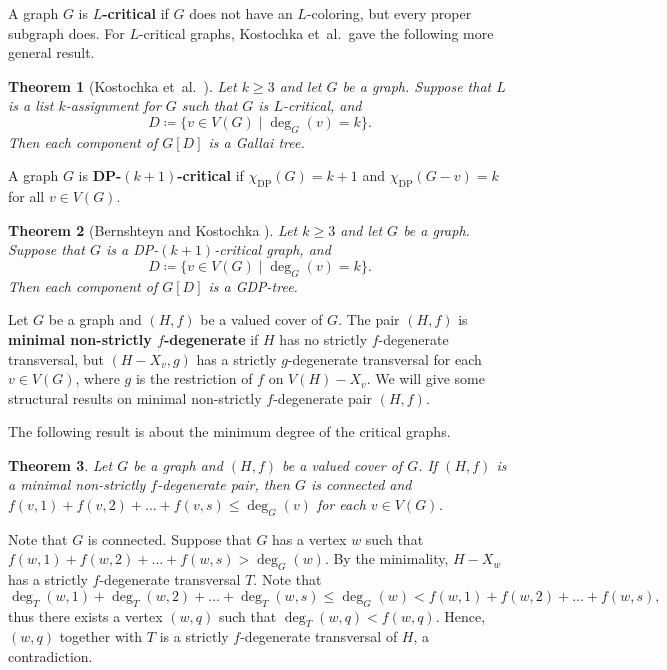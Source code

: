 \documentclass{article}
\makeatletter
\renewenvironment{proof}[1][\proofname]{\par
  \pushQED{\qed}%
  \normalfont \topsep6\p@\@plus6\p@\relax
  \trivlist
  \item[\hskip\labelsep
        \bfseries
    #1\@addpunct{.}]\ignorespaces
}{%
  \popQED\endtrivlist\@endpefalse
}
\newtheorem{theorem}{Theorem}[section]
\theoremstyle{definition}
\newcommand{\etal}{et~al.\ }
\makeatother
\begin{document}
A graph $G$ is \textbf{$L$-critical} if $G$ does not have an $L$-coloring, but every proper subgraph does. For $L$-critical graphs, Kostochka \etal gave the following more general result. 

\begin{theorem}[Kostochka \etal \cite{MR1425799}]\label{Critical-2}
Let $k \geq 3$ and let $G$ be a graph. Suppose that $L$ is a list $k$-assignment for $G$ such that $G$ is $L$-critical, and 
\begin{equation*}
D \coloneqq\{v \in V(G) \mid \deg_{G}(v) = k\}. 
\end{equation*} 
Then each component of $G[D]$ is a Gallai tree. 
\end{theorem}

A graph $G$ is \textbf{DP-$(k + 1)$-critical} if $\chi_{\mathrm{DP}}(G) = k + 1$ and $\chi_{\mathrm{DP}}(G - v) = k$ for all $v \in V(G)$. 

\begin{theorem}[Bernshteyn and Kostochka \cite{MR3686937}]\label{Critical-3}
Let $k \geq 3$ and let $G$ be a graph. Suppose that $G$ is a DP-$(k + 1)$-critical graph, and 
\begin{equation*}
D \coloneqq\{v \in V(G) \mid \deg_{G}(v) = k\}. 
\end{equation*} 
Then each component of $G[D]$ is a GDP-tree. 
\end{theorem}

Let $G$ be a graph and $(H, f)$ be a valued cover of $G$. The pair $(H, f)$ is \textbf{minimal non-strictly $f$-degenerate} if $H$ has no strictly $f$-degenerate transversal, but $(H - X_{v}, g)$ has a strictly $g$-degenerate transversal for each $v \in V(G)$, where $g$ is the restriction of $f$ on $V(H) - X_{v}$. We will give some structural results on minimal non-strictly $f$-degenerate pair $(H, f)$. 

The following result is about the minimum degree of the critical graphs. 
\begin{theorem}\label{L}
Let $G$ be a graph and $(H, f)$ be a valued cover of $G$. If $(H, f)$ is a minimal non-strictly $f$-degenerate pair, then $G$ is connected and $f(v, 1) + f(v, 2) + \dots + f(v, s) \leq \deg_{G}(v)$ for each $v \in V(G)$. 
\end{theorem}
\begin{proof}
Note that $G$ is connected. Suppose that $G$ has a vertex $w$ such that $f(w, 1) + f(w, 2) + \dots + f(w, s) > \deg_{G}(w)$. By the minimality, $H - X_{w}$ has a strictly $f$-degenerate transversal $T$. Note that 
\begin{equation*}
\deg_{T}(w, 1) + \deg_{T}(w, 2) + \dots + \deg_{T}(w, s) \leq \deg_{G}(w) < f(w, 1) + f(w, 2) + \dots + f(w, s),
\end{equation*}
thus there exists a vertex $(w, q)$ such that $\deg_{T}(w, q) < f(w, q)$. Hence, $(w, q)$ together with $T$ is a strictly $f$-degenerate transversal of $H$, a contradiction. 
\end{proof}
\end{document}

